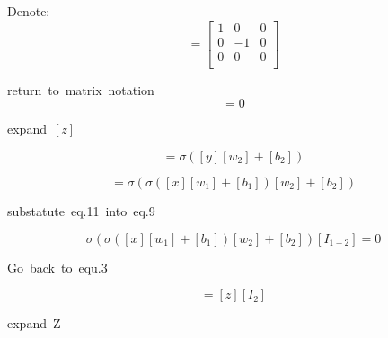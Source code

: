 \documentclass{article}
\begin{document}
\hbox{Denote: }
\begin{equation}
    [I_{1-2}] = \begin{bmatrix}   
        1 & 0 & 0 \\
        0 & -1 & 0 \\
        0 & 0 & 0 \\
        \end{bmatrix}
\end{equation}

\hbox{return to matrix notation}
\begin{equation}
    [z][I_{1-2}] = 0
\end{equation}


\hbox{expand $[z]$}

\begin{equation}
    [z] = \sigma([y][w_2] + [b_2])
\end{equation}

\begin{equation}
    [z] = \sigma(
            \sigma([x][w_1] + [b_1])
        [w_2] + [b_2])
\end{equation}

\hbox{substatute eq.11 into eq.9}

\begin{equation}
    \sigma(
            \sigma([x][w_1] + [b_1])
        [w_2] + [b_2])[I_{1-2}] = 0
\end{equation}

\hbox{Go back to equ.3}

\begin{equation}
    [z][I_1] = [z][I_2]
\end{equation}

\hbox{expand Z}
\end{document}
